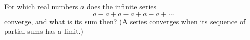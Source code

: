 For which real numbers $a$ does the infinite series
\[
a-a+a-a+a-a+\cdots
\]
converge, and what is its sum then? (A series converges when its sequence of partial sums has a limit.)
